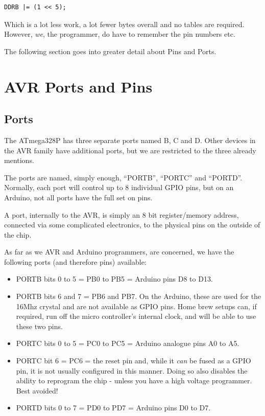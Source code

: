 \begin{lstlisting}[numbers={none}]
	DDRB |= (1 << 5);
\end{lstlisting}

Which is a lot less work, a lot fewer bytes overall and no tables are required. However, \emph{we}, the programmer, do have to remember the pin numbers etc.

The following section goes into greater detail about Pins and Ports.

\section{AVR Ports and Pins}\label{avr-ports-and-pins}

\subsection{Ports}\label{avr-ports}

The ATmega328P has three separate ports named B, C and D. Other devices in the AVR family have additional ports, but we are restricted to the three already mentions.

The ports are named, simply enough, ``PORTB'', ``PORTC'' and ``PORTD''. Normally, each port will control up to 8 individual GPIO  pins, but on an Arduino, not all ports have the full set on pins.

A port, internally to the AVR, is simply an 8 bit register/memory address, connected via some complicated electronics, to the physical pins on the outside of the chip.

As far as we AVR and Arduino programmers, are concerned, we have the following ports (and therefore pins) available:

\begin{itemize}
	\item PORTB bits 0 to 5 = PB0 to PB5 = Arduino pins D8 to D13.
	\item PORTB bits 6 and 7 = PB6 and PB7. On the Arduino, these are used for the 16Mhz crystal and are not available as GPIO pins. Home brew setups can, if required, run off the micro controller's internal clock, and will be able to use these two pins.
	\item PORTC bits 0 to 5 = PC0 to PC5 = Arduino analogue pins A0 to A5.
	\item PORTC bit 6 = PC6 = the reset pin and, while it \emph{can} be fused as a GPIO pin, it is not usually configured in this manner. Doing so also disables the ability to reprogram the chip - unless you have a high voltage programmer. Best avoided!
	\item PORTD bits 0 to 7 = PD0 to PD7 = Arduino pins D0 to D7.
\end{itemize}

